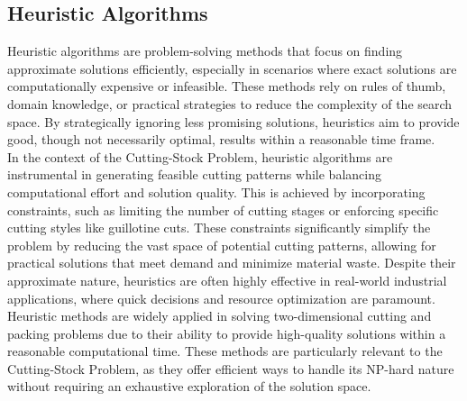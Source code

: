 \documentclass[a4paper]{article}
\begin{document}
    \subsection{Heuristic Algorithms}
    Heuristic algorithms are problem-solving methods that focus on finding approximate solutions efficiently, especially in scenarios where exact solutions are computationally expensive or infeasible. These methods rely on rules of thumb, domain knowledge, or practical strategies to reduce the complexity of the search space. By strategically ignoring less promising solutions, heuristics aim to provide good, though not necessarily optimal, results within a reasonable time frame.
    \vspace{0.2cm}\\
    In the context of the Cutting-Stock Problem, heuristic algorithms are instrumental in generating feasible cutting patterns while balancing computational effort and solution quality. This is achieved by incorporating constraints, such as limiting the number of cutting stages or enforcing specific cutting styles like guillotine cuts. These constraints significantly simplify the problem by reducing the vast space of potential cutting patterns, allowing for practical solutions that meet demand and minimize material waste. Despite their approximate nature, heuristics are often highly effective in real-world industrial applications, where quick decisions and resource optimization are paramount.
    \vspace{0.2cm}\\
    Heuristic methods are widely applied in solving two-dimensional cutting and packing problems due to their ability to provide high-quality solutions within a reasonable computational time. These methods are particularly relevant to the Cutting-Stock Problem, as they offer efficient ways to handle its NP-hard nature without requiring an exhaustive exploration of the solution space.
\end{document}
